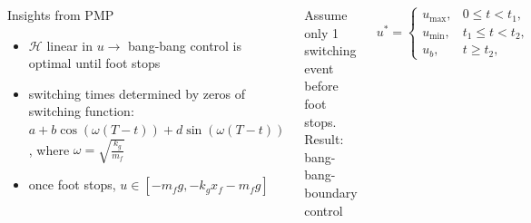 \documentclass[aspectratio=169,9pt,xcolor=dvipsnames]{beamer}
\begin{document}
\begin{frame}
\begin{columns}[T]
\begin{block}{Insights from PMP}
\begingroup
\small
\begin{itemize}
\item $\mathcal{H}$ linear in $u \rightarrow$ bang-bang control is optimal until foot stops
\item switching times determined by zeros of switching function: $a + b\cos{\left(\omega \left(T-t\right)\right)} + d\sin{\left(\omega \left(T-t\right)\right)}$, where $\omega = \sqrt{\frac{k_g}{m_f}}$
\item once foot stops, $u \in \left[-m_f g,-k_g x_f - m_f g\right]$
\end{itemize}
\endgroup
\end{block}

Assume only 1 switching event before foot stops. Result:
\alert{bang-bang-boundary} control

\begin{equation*}
u^* =
\begin{cases}
u_{\text{max}}, & 0\leq t < t_1\text{,}\\
u_{\text{min}}, & t_1 \leq t < t_2\text{,}\\
u_{b},  & t \geq t_2\text{,}
\end{cases}
\end{equation*}

\end{columns}
\end{frame}

\end{document}
